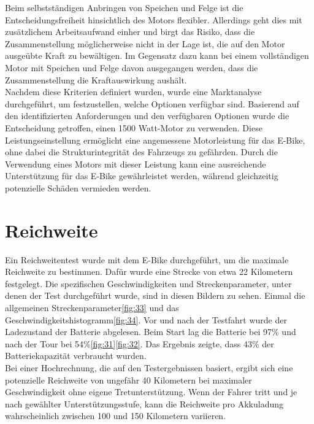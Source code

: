 Beim selbstständigen Anbringen von Speichen und Felge ist die Entscheidungsfreiheit hinsichtlich des Motors flexibler.
Allerdings geht dies mit zusätzlichem Arbeitsaufwand einher und birgt das Risiko, dass die Zusammenstellung möglicherweise nicht in der Lage ist, die auf den Motor ausgeübte Kraft zu bewältigen.
Im Gegensatz dazu kann bei einem vollständigen Motor mit Speichen und Felge davon ausgegangen werden, dass die Zusammenstellung die Kraftauswirkung aushält.\\

Nachdem diese Kriterien definiert wurden, wurde eine Marktanalyse durchgeführt, um festzustellen, welche Optionen verfügbar sind.
Basierend auf den identifizierten Anforderungen und den verfügbaren Optionen wurde die Entscheidung getroffen, einen 1500 Watt-Motor zu verwenden.
Diese Leistungseinstellung ermöglicht eine angemessene Motorleistung für das E-Bike, ohne dabei die Strukturintegrität des Fahrzeugs zu gefährden.
Durch die Verwendung eines Motors mit dieser Leistung kann eine ausreichende Unterstützung für das E-Bike gewährleistet werden, während gleichzeitig potenzielle Schäden vermieden werden.\\


\section{Reichweite}

Ein Reichweitentest wurde mit dem E-Bike durchgeführt, um die maximale Reichweite zu bestimmen.
Dafür wurde eine Strecke von etwa 22 Kilometern festgelegt.
Die spezifischen Geschwindigkeiten und Streckenparameter, unter denen der Test durchgeführt wurde, sind in diesen Bildern zu sehen. 
Einmal die allgemeinen Streckenparameter\ref{fig:33} und das Geschwindigkeitshistogramm\ref{fig:34}.
Vor und nach der Testfahrt wurde der Ladezustand der Batterie abgelesen.
Beim Start lag die Batterie bei 97\% und nach der Tour bei 54\%\ref{fig:31}\ref{fig:32}.
Das Ergebnis zeigte, dass 43\% der Batteriekapazität verbraucht wurden.\\

Bei einer Hochrechnung, die auf den Testergebnissen basiert, ergibt sich eine potenzielle Reichweite von ungefähr 40 Kilometern bei maximaler Geschwindigkeit ohne eigene Tretunterstützung.
Wenn der Fahrer tritt und je nach gewählter Unterstützungsstufe, kann die Reichweite pro Akkuladung wahrscheinlich zwischen 100 und 150 Kilometern variieren.








